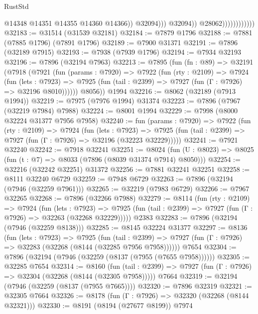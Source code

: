 \begin{lexlean}{RustStd}
\begin{coremodule}
                                          @14348
                                          @14351
                                          @14355
                                          @14360
                                          @14366))
                                      @32094)))
                                @32094))
                            @28062))))))))))))
@32183 := @31514 (@31539 @32181)
@32184 := @7879 @1796
@32188 := @7881 (@7885 @1796) (@7891 @1796)
@32189 := @7900 @31371
@32191 := @7896 (@32189 @7915)
@32193 := @7938 (@7939 @1796)
@32194 := @7934 @32193
@32196 := @7896 (@32194 @7963)
@32213 := @7895
    (fun (fn : @89) =>
    @32191
      (@7918
        (@7921
          (fun (params : @7920) =>
          @7922
            (fun (rty : @2109) =>
            @7924
              (fun (lets : @7923) =>
              @7925 (fun (tail : @2399) => @7927 (fun (Γ : @7926) => @32196 @8010))))))
        @8056))
    @1994
@32216 := @8062 (@32189 (@7913 @1994))
@32219 := @7975 (@7976 @1994) @31374
@32223 := @7896 (@7967 (@32219 @7984) @7988)
@32224 := @8001 @1994
@32229 := @7998 (@8000 @32224 @31377 @7956 @7958)
@32240 := fun (params : @7920) =>
  @7922
    (fun (rty : @2109) =>
    @7924
      (fun (lets : @7923) =>
      @7925 (fun (tail : @2399) => @7927 (fun (Γ : @7926) => @32196 (@32223 @32229)))))
@32241 := @7921 @32240
@32242 := @7918 @32241
@32251 := @8024
    (fun (U : @8023) => @8025 (fun (t : @7) => @8033 (@7896 (@8039 @31374 @7914) @8050)))
@32254 := @32216 (@32242 @32251) @31372
@32256 := @7881 @32241 @32251
@32258 := @8111 @32240 @6729
@32259 := @7948 @6729
@32263 := @7896 (@32194 (@7946 (@32259 @7961)))
@32265 := @32219 (@7983 @6729)
@32266 := @7967 @32265
@32268 := @7896 (@32266 @7988)
@32279 := @8114
    (fun (rty : @2109) =>
    @7924
      (fun (lets : @7923) =>
      @7925 (fun (tail : @2399) => @7927 (fun (Γ : @7926) => @32263 (@32268 @32229)))))
    @2383
@32283 := @7896 (@32194 (@7946 (@32259 @8138)))
@32285 := @8145 @32224 @31377
@32297 := @8136
    (fun (lets : @7923) =>
    @7925
      (fun (tail : @2399) =>
      @7927 (fun (Γ : @7926) => @32283 (@32268 (@8144 (@32285 @7956 @7958))))))
    @7654
@32304 := @7896 (@32194 (@7946 (@32259 (@8137 (@7955 (@7655 @7958))))))
@32305 := @32285 @7654
@32314 := @8160
    (fun (tail : @2399) => @7927 (fun (Γ : @7926) => @32304 (@32268 (@8144 (@32305 @7958)))))
    @7664
@32319 := @32194 (@7946 (@32259 (@8137 (@7955 @7665))))
@32320 := @7896 @32319
@32321 := @32305 @7664
@32326 := @8178 (fun (Γ : @7926) => @32320 (@32268 (@8144 @32321)))
@32330 := @8191 (@8194 (@27677 @8199)) @7974

\end{coremodule}
\end{lexlean}
